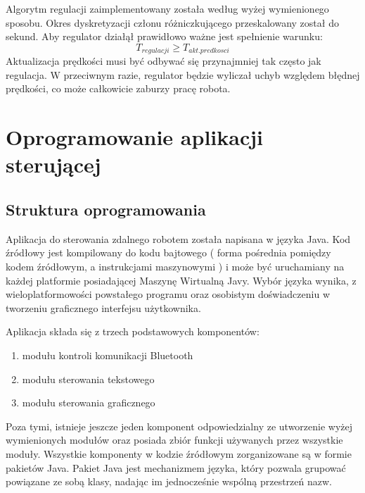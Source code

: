 \documentclass[eng,printmode]{mgr}
\begin{document}
Algorytm regulacji zaimplementowany została według wyżej wymienionego sposobu. Okres dyskretyzacji członu różniczkującego przeskalowany został do sekund. Aby regulator działął prawidłowo ważne jest spełnienie warunku:
\begin{equation}\label{eq:aproksymacja}
    T_{regulacji}  \geq  T_{akt. predkosci} 
  \end{equation}
Aktualizacja prędkości musi być odbywać się przynajmniej tak często jak regulacja. W przeciwnym razie, regulator będzie wyliczał uchyb względem błędnej prędkości, co może całkowicie zaburzy pracę robota.

\chapter{Oprogramowanie aplikacji sterującej}
 \section{Struktura oprogramowania}
Aplikacja do sterowania zdalnego robotem została napisana w języka Java. Kod źródłowy jest kompilowany do kodu bajtowego ( forma pośrednia pomiędzy kodem źródłowym, a instrukcjami maszynowymi ) i może być uruchamiany na każdej platformie posiadającej Maszynę Wirtualną Javy. Wybór języka wynika, z wieloplatformowości powstałego programu oraz osobistym doświadczeniu w tworzeniu graficznego interfejsu użytkownika. 

Aplikacja składa się z trzech podstawowych komponentów:
\begin{enumerate}
 \item modułu kontroli komunikacji Bluetooth
 \item modułu sterowania tekstowego
 \item modułu sterowania graficznego
\end{enumerate}

Poza tymi, istnieje jeszcze jeden komponent odpowiedzialny ze utworzenie wyżej wymienionych modułów oraz posiada zbiór funkcji używanych przez wszystkie moduły. Wszystkie komponenty w kodzie źródłowym zorganizowane są w formie pakietów Java. Pakiet Java jest mechanizmem języka, który pozwala grupować powiązane ze sobą klasy, nadając im jednocześnie wspólną przestrzeń nazw.
\end{document}
